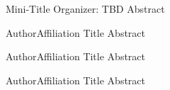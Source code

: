 \label{mini1}
\miniabs
{Mini-Title}
{Organizer: TBD}
{Abstract}

\vspace{2ex}

\abs
{Author}{Affiliation}
{Title}
{Abstract
}

\vspace{1.5ex}

\abs
{Author}{Affiliation}
{Title}
{Abstract
}

\vspace{1.5ex}

\abs
{Author}{Affiliation}
{Title}
{Abstract
}
